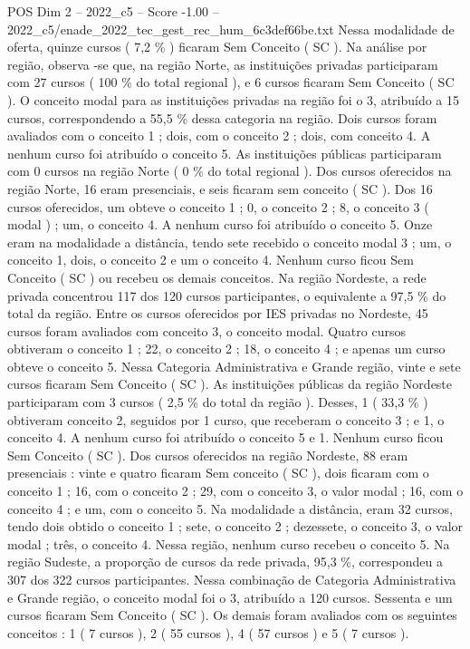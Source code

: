 \begin{textsample}{POS Dim 2 – 2022\_c5 – Score -1.00 – 2022\_c5/enade\_2022\_tec\_gest\_rec\_hum\_6c3def66be.txt}
Nessa modalidade de oferta, quinze cursos ( 7,2 \% ) ficaram Sem Conceito ( SC ).
Na análise por região, observa -se que, na região Norte, as instituições privadas participaram com 27 cursos ( 100 \% do total regional ), e 6 cursos ficaram Sem Conceito ( SC ).
O conceito modal para as instituições privadas na região foi o 3, atribuído a 15 cursos, correspondendo a 55,5 \% dessa categoria na região.
Dois cursos foram avaliados com o conceito 1 ; dois, com o conceito 2 ; dois, com conceito 4.
A nenhum curso foi atribuído o conceito 5.
As instituições públicas participaram com 0 cursos na região Norte ( 0 \% do total regional ).
Dos cursos oferecidos na região Norte, 16 eram presenciais, e seis ficaram sem conceito ( SC ).
Dos 16 cursos oferecidos, um obteve o conceito 1 ; 0, o conceito 2 ; 8, o conceito 3 ( modal ) ; um, o conceito 4.
A nenhum curso foi atribuído o conceito 5.
Onze eram na modalidade a distância, tendo sete recebido o conceito modal 3 ; um, o conceito 1, dois, o conceito 2 e um o conceito 4.
Nenhum curso ficou Sem Conceito ( SC ) ou recebeu os demais conceitos.
Na região Nordeste, a rede privada concentrou 117 dos 120 cursos participantes, o equivalente a 97,5 \% do total da região.
Entre os cursos oferecidos por IES privadas no Nordeste, 45 cursos foram avaliados com conceito 3, o conceito modal.
Quatro cursos obtiveram o conceito 1 ; 22, o conceito 2 ; 18, o conceito 4 ; e apenas um curso obteve o conceito 5.
Nessa Categoria Administrativa e Grande região, vinte e sete cursos ficaram Sem Conceito ( SC ).
As instituições públicas da região Nordeste participaram com 3 cursos ( 2,5 \% do total da região ).
Desses, 1 ( 33,3 \% ) obtiveram conceito 2, seguidos por 1 curso, que receberam o conceito 3 ; e 1, o conceito 4.
A nenhum curso foi atribuído o conceito 5 e 1.
Nenhum curso ficou Sem Conceito ( SC ).
Dos cursos oferecidos na região Nordeste, 88 eram presenciais : vinte e quatro ficaram Sem conceito ( SC ), dois ficaram com o conceito 1 ; 16, com o conceito 2 ; 29, com o conceito 3, o valor modal ; 16, com o conceito 4 ; e um, com o conceito 5.
Na modalidade a distância, eram 32 cursos, tendo dois obtido o conceito 1 ; sete, o conceito 2 ; dezessete, o conceito 3, o valor modal ; três, o conceito 4.
Nessa região, nenhum curso recebeu o conceito 5.
Na região Sudeste, a proporção de cursos da rede privada, 95,3 \%, correspondeu a 307 dos 322 cursos participantes.
Nessa combinação de Categoria Administrativa e Grande região, o conceito modal foi o 3, atribuído a 120 cursos.
Sessenta e um cursos ficaram Sem Conceito ( SC ).
Os demais foram avaliados com os seguintes conceitos : 1 ( 7 cursos ), 2 ( 55 cursos ), 4 ( 57 cursos ) e 5 ( 7 cursos ).

\end{textsample}

